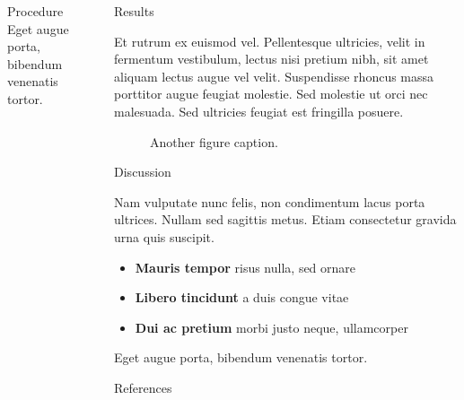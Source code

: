 \documentclass[final]{beamer}
\newlength{\sepwidth}
\newlength{\colwidth}
\newcommand{\separatorcolumn}{\begin{column}{\sepwidth}\end{column}}
\begin{document}
\begin{frame}[t]
\begin{columns}[t]
\begin{column}{\colwidth}
\begin{block}{Procedure}
    Eget augue porta, bibendum venenatis tortor.

  \end{block}

\end{column}

\separatorcolumn

\begin{column}{\colwidth}

  \begin{block}{Results}

    Et rutrum ex euismod vel. Pellentesque ultricies, velit in fermentum
    vestibulum, lectus nisi pretium nibh, sit amet aliquam lectus augue vel
    velit. Suspendisse rhoncus massa porttitor augue feugiat molestie. Sed
    molestie ut orci nec malesuada. Sed ultricies feugiat est fringilla
    posuere.

    \begin{figure}
      \centering
      \caption{Another figure caption.}
    \end{figure}

  \end{block}
    
      \begin{block}{Discussion}

    Nam vulputate nunc felis, non condimentum lacus porta ultrices. Nullam sed
    sagittis metus. Etiam consectetur gravida urna quis suscipit.

    \begin{itemize}
      \item \textbf{Mauris tempor} risus nulla, sed ornare
      \item \textbf{Libero tincidunt} a duis congue vitae
      \item \textbf{Dui ac pretium} morbi justo neque, ullamcorper
    \end{itemize}

    Eget augue porta, bibendum venenatis tortor.

  \end{block}

  \begin{block}{References}

    \nocite{*}
    \footnotesize{}

  \end{block}

\end{column}
\end{columns}
\end{frame}
\end{document}
